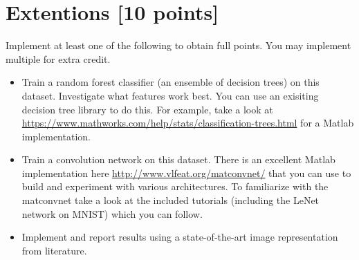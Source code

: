 \documentclass[10pt,letterpaper]{article}
\begin{document}
\section{Extentions [10 points]}
Implement at least one of the following to obtain full points. You may implement multiple 
for extra credit. 

\begin{itemize}
\item Train a random forest classifier (an ensemble of decision trees) on this dataset. Investigate what features work best. You can use an exisiting decision tree library to do this. For example, take a look at \url{https://www.mathworks.com/help/stats/classification-trees.html} for a Matlab implementation. 
\item Train a convolution network on this dataset. There is an excellent Matlab implementation here \url{http://www.vlfeat.org/matconvnet/} that you can use to build and experiment with various architectures. To familiarize with the matconvnet take a look at the included tutorials (including the LeNet network on MNIST) which you can follow.
\item Implement and report results using a state-of-the-art image representation from literature.
\end{itemize}
\end{document}
